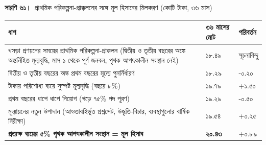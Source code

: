 \documentclass[border=10pt]{standalone}
\begin{document}
\begin{minipage}{17cm}
{\large\bfseries সারণি ৬১।}\ {\large প্রাথমিক পরিকল্পনা-প্রাক্কলনের সঙ্গে মূল হিসাবের মিলকরণ (কোটি টাকা, ৩৬ মাস)}\par\vspace{7pt}
\small
{}
\begin{tabularx}{\linewidth}{@{}>{\hsize=1.974\hsize\raggedright\arraybackslash}X>{\hsize=0.513\hsize\raggedright\arraybackslash}X>{\hsize=0.513\hsize\raggedright\arraybackslash}X@{}}
\arrayrulecolor{bapilrule}\toprule
\rowcolor{white}\textbf{ধাপ} & \textbf{৩৬ মাসের মোট} & \textbf{পরিবর্তন} \\
\midrule
খসড়া প্রণয়নের সময়ের প্রাথমিক পরিকল্পনা-প্রাক্কলন (দ্বিতীয় ও তৃতীয় বছরের অঙ্কে অন্তর্নিহিত মূল্যবৃদ্ধি, মাস ১ থেকে পূর্ণ জনবল, পৃথক আপৎকালীন সংস্থান নেই) & ১৮.৪৯ & সূচনাবিন্দু \\
দ্বিতীয় ও তৃতীয় বছরের অঙ্ক প্রথম বছরের মূল্যে পুনর্নির্ধারণ & ১৮.২৯ & -০.২০ \\
টাকায় পরিশোধ্য ব্যয়ে সুস্পষ্ট মূল্যবৃদ্ধি (বছরে ৮\%) & ১৯.৭৯ & +১.৫০ \\
প্রথম বছরের ধাপে ধাপে নিয়োগ (গড়ে ৭৫\% পদ পূরণ) & ১৯.২৯ & -০.৫০ \\
মূল্যায়নের নতুন উপাদান (আওতাবহির্ভূত প্রশ্নসেট, উদ্ধৃতি-বিচার, ব্যবস্থাগুলোর বার্ষিক নিরীক্ষা) & ১৯.৫৪ & +০.২৫ \\
\textbf{প্রত্যক্ষ ব্যয়ের ৫\% পৃথক আপৎকালীন সংস্থান = মূল হিসাব} & \textbf{২০.৪৩} & +০.৮৯ \\
\bottomrule
\end{tabularx}
\par{}
\par{}
\end{minipage}
\end{document}

